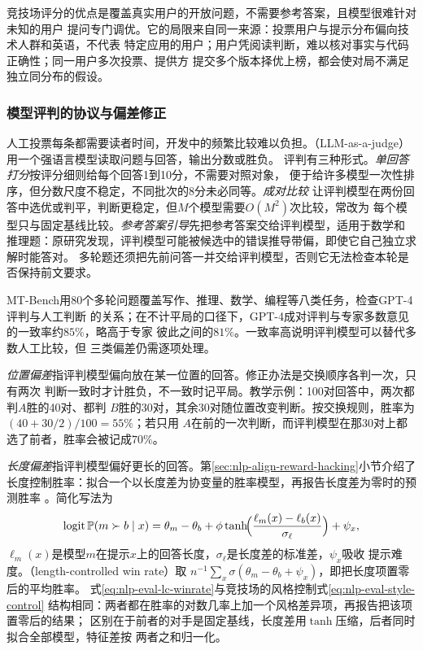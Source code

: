 竞技场评分的优点是覆盖真实用户的开放问题，不需要参考答案，且模型很难针对未知的用户
提问专门调优。它的局限来自同一来源：投票用户与提示分布偏向技术人群和英语，不代表
特定应用的用户；用户凭阅读判断，难以核对事实与代码正确性；同一用户多次投票、提供方
提交多个版本择优上榜，都会使对局不满足独立同分布的假设。

\subsubsection{模型评判的协议与偏差修正}
\label{sec:nlp-eval-judge-protocol}

人工投票每条都需要读者时间，开发中的频繁比较难以负担。（LLM-as-a-judge）
用一个强语言模型读取问题与回答，输出分数或胜负。
评判有三种形式。\emph{单回答打分}按评分细则给每个回答1到10分，不需要对照对象，
便于给许多模型一次性排序，但分数尺度不稳定，不同批次的8分未必同等。\emph{成对比较}
让评判模型在两份回答中选优或判平，判断更稳定，但$M$个模型需要$O(M^2)$次比较，常改为
每个模型只与固定基线比较。\emph{参考答案引导}先把参考答案交给评判模型，适用于数学和
推理题：原研究发现，评判模型可能被候选中的错误推导带偏，即使它自己独立求解时能答对。
多轮题还须把先前问答一并交给评判模型，否则它无法检查本轮是否保持前文要求。

MT-Bench用80个多轮问题覆盖写作、推理、数学、编程等八类任务，检查GPT-4评判与人工判断
的关系；在不计平局的口径下，GPT-4成对评判与专家多数意见的一致率约$85\%$，略高于专家
彼此之间的$81\%$。一致率高说明评判模型可以替代多数人工比较，但
三类偏差仍需逐项处理。

\emph{位置偏差}指评判模型偏向放在某一位置的回答。修正办法是交换顺序各判一次，只有两次
判断一致时才计胜负，不一致时记平局。教学示例：100对回答中，两次都判$A$胜的40对、都判
$B$胜的30对，其余30对随位置改变判断。按交换规则，胜率为$(40+30/2)/100=55\%$；若只用
$A$在前的一次判断，而评判模型在那30对上都选了前者，胜率会被记成$70\%$。

\emph{长度偏差}指评判模型偏好更长的回答。第\ref{sec:nlp-align-reward-hacking}小节介绍了
长度控制胜率：拟合一个以长度差为协变量的胜率模型，再报告长度差为零时的预测胜率
。简化写法为
\begin{equation}
 \operatorname{logit}\mathbb P(m\succ b\mid x)
 =\theta_m-\theta_b+\phi\tanh\!\Bigl(\frac{\ell_m(x)-\ell_b(x)}{\sigma_\ell}\Bigr)+\psi_x,
 \label{eq:nlp-eval-lc-winrate}
\end{equation}
$\ell_m(x)$是模型$m$在提示$x$上的回答长度，$\sigma_\ell$是长度差的标准差，$\psi_x$吸收
提示难度。（length-controlled win rate）取
$n^{-1}\sum_x\sigma(\theta_m-\theta_b+\psi_x)$，即把长度项置零后的平均胜率。
式\eqref{eq:nlp-eval-lc-winrate}与竞技场的风格控制式\eqref{eq:nlp-eval-style-control}
结构相同：两者都在胜率的对数几率上加一个风格差异项，再报告把该项置零后的结果；
区别在于前者的对手是固定基线，长度差用$\tanh$压缩，后者同时拟合全部模型，特征差按
两者之和归一化。

